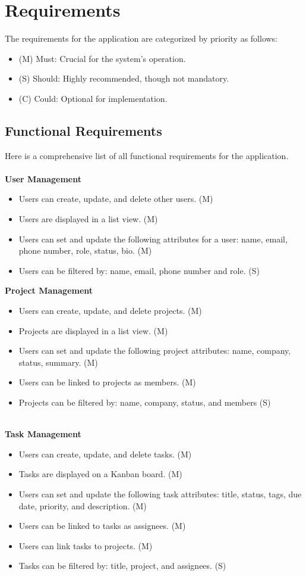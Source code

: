 \section{Requirements}
The requirements for the application are categorized by priority as follows:
\begin{itemize}
   \item (M) Must: Crucial for the system's operation.
   \item (S) Should: Highly recommended, though not mandatory.
   \item (C) Could: Optional for implementation.
\end{itemize}

\subsection{Functional Requirements}
Here is a comprehensive list of all functional requirements for the application.\\\\
\textbf{User Management}
\begin{itemize}
   \item Users can create, update, and delete other users. (M)
   \item Users are displayed in a list view. (M)
   \item Users can set and update the following attributes for a user: name, email, phone number, role, status, bio. (M)
   \item Users can be filtered by: name, email, phone number and role. (S)
\end{itemize}
\textbf{Project Management}
\begin{itemize}
   \item Users can create, update, and delete projects. (M)
   \item Projects are displayed in a list view. (M)
   \item Users can set and update the following project attributes: name, company, status, summary. (M)
   \item Users can be linked to projects as members. (M)
   \item Projects can be filtered by: name, company, status, and members (S)
\end{itemize}
\  \\
\textbf{Task Management}
\begin{itemize}
   \item Users can create, update, and delete tasks. (M)
   \item Tasks are displayed on a Kanban board. (M)
   \item Users can set and update the following task attributes: title, status, tags, due date, priority, and description. (M)
   \item Users can be linked to tasks as assignees. (M)
   \item Users can link tasks to projects. (M)
   \item Tasks can be filtered by: title, project, and assignees. (S)
\end{itemize}
